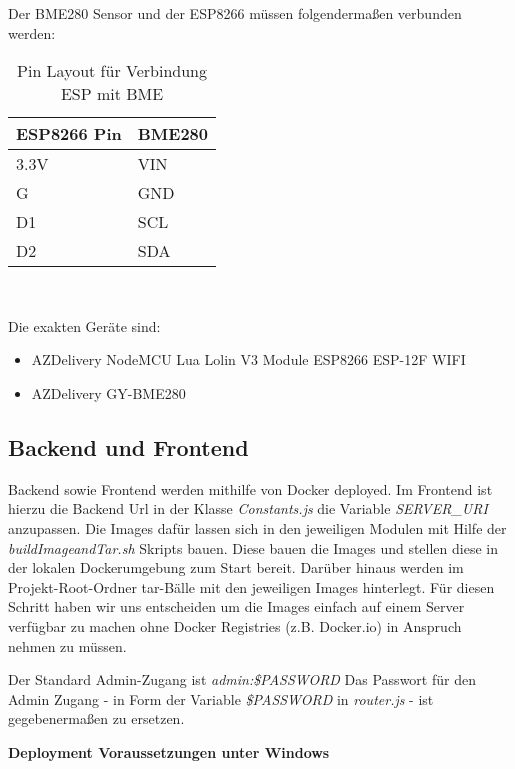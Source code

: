 Der BME280 Sensor und der ESP8266 müssen folgendermaßen verbunden werden:

\begin{table}[hbt]
	\centering
	\begin{minipage}[t]{.5\textwidth}
		\caption{Pin Layout für Verbindung ESP mit BME}
	\begin{tabular}{|l|l|}
		\hline
		\textbf{ESP8266 Pin}	& \textbf{BME280}  \\
		\hline
		3.3V & VIN \\
		\hline
		G & GND \\
		\hline
		D1 & SCL \\
		\hline
		D2 & SDA \\
		\hline
	\end{tabular}
	\\
\label{tab:espBmePinout}
\end{minipage}
\end{table}

Die exakten Geräte sind:

\begin{itemize}
	\item AZDelivery NodeMCU Lua Lolin V3 Module ESP8266 ESP-12F WIFI
	\item AZDelivery GY-BME280
\end{itemize}

\subsection{Backend und Frontend}

Backend sowie Frontend werden mithilfe von Docker deployed. Im Frontend ist hierzu die Backend Url in der Klasse \textit{Constants.js} die Variable \textit{SERVER\_URI} anzupassen. Die Images dafür lassen sich in den jeweiligen Modulen mit Hilfe der \textit{buildImageandTar.sh} Skripts bauen. Diese bauen die Images und stellen diese in der lokalen Dockerumgebung zum Start bereit. Darüber hinaus werden im Projekt-Root-Ordner tar-Bälle mit den jeweiligen Images hinterlegt. Für diesen Schritt haben wir uns entscheiden um die Images einfach auf einem Server verfügbar zu machen ohne Docker Registries (z.B. Docker.io) in Anspruch nehmen zu müssen.

Der Standard Admin-Zugang ist \textit{admin:\$PASSWORD} Das Passwort für den Admin Zugang - in Form der Variable \textit{\$PASSWORD} in \textit{router.js} - ist gegebenermaßen zu ersetzen.

\textbf{Deployment Voraussetzungen unter Windows}

